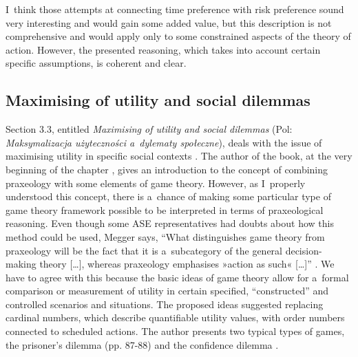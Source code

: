 I~think those attempts at connecting time preference with risk preference sound very interesting and would gain some added value, but this description is not comprehensive and would apply only to some constrained aspects of the theory of action. However, the presented reasoning, which takes into account certain specific assumptions, is coherent and clear.



\subsection{Maximising of utility and social dilemmas}



Section 3.3, entitled \textit{Maximising of utility and social dilemmas} (Pol: \textit{Maksymalizacja użyteczności a~dylematy społeczne}), deals with the issue of maximising utility in specific social contexts 
\parencite[][pp.82–94]{megger_sprawiedliwosc_2021}. %
 The author of the book, at the very beginning of the chapter 
\parencite[][pp.83–86]{megger_sprawiedliwosc_2021}, %
 gives an introduction to the concept of combining praxeology with some elements of game theory. However, as I~properly understood this concept, there is a~chance of making some particular type of game theory framework possible to be interpreted in terms of praxeological reasoning. Even though some ASE representatives had doubts about how this method could be used, Megger says, ``What distinguishes game theory from praxeology will be the fact that it is a~subcategory of the general decision-making theory […], whereas praxeology emphasises »action as such« […]'' 
\parencite[][p.85]{megger_sprawiedliwosc_2021}. %
 We have to agree with this because the basic ideas of game theory allow for a~formal comparison or measurement of utility in certain specified, ``constructed'' and controlled scenarios and situations. The proposed ideas suggested replacing cardinal numbers, which describe quantifiable utility values, with order numbers connected to scheduled actions. The author presents two typical types of games, the prisoner's dilemma (pp. 87-88) and the confidence dilemma 
\parencite[][pp.89–91]{megger_sprawiedliwosc_2021}.%




